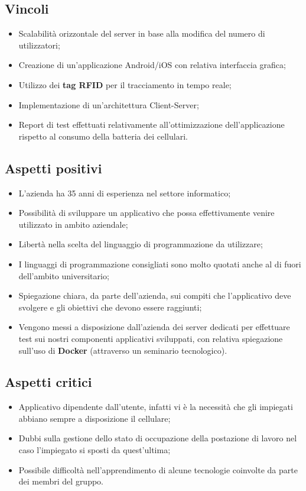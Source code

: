 \subsection{Vincoli}{
\begin{itemize}
\item Scalabilità orizzontale del server in base alla modifica del numero di utilizzatori;
\item Creazione di un'applicazione Android/iOS con relativa interfaccia grafica;
\item Utilizzo dei \textbf{tag RFID} per il tracciamento in tempo reale;
\item Implementazione di un'architettura Client-Server;
\item Report di test effettuati relativamente all'ottimizzazione dell'applicazione rispetto al consumo della
batteria dei cellulari.
\end{itemize}
}

\subsection{Aspetti positivi}{
\begin{itemize}
\item L'azienda ha 35 anni di esperienza nel settore informatico;
\item Possibilità di sviluppare un applicativo che possa effettivamente venire utilizzato in ambito aziendale;
\item Libertà nella scelta del linguaggio di programmazione da utilizzare;
\item I linguaggi di programmazione consigliati sono molto quotati anche al di fuori dell'ambito universitario;
\item Spiegazione chiara, da parte dell'azienda, sui compiti che l'applicativo deve svolgere e gli obiettivi che devono essere raggiunti;
\item Vengono messi a disposizione dall'azienda dei server dedicati per effettuare test sui nostri componenti applicativi sviluppati, con relativa spiegazione sull'uso di \textbf{Docker} (attraverso un seminario tecnologico).
\end{itemize}
}

\subsection{Aspetti critici}{
\begin{itemize}
\item Applicativo dipendente dall'utente, infatti vi è la necessità che gli impiegati abbiano sempre a disposizione il cellulare;
\item Dubbi sulla gestione dello stato di occupazione della postazione di lavoro nel caso l'impiegato si sposti da quest'ultima;
\item Possibile difficoltà nell'apprendimento di alcune tecnologie coinvolte da parte dei membri del gruppo.
\end{itemize}
}

